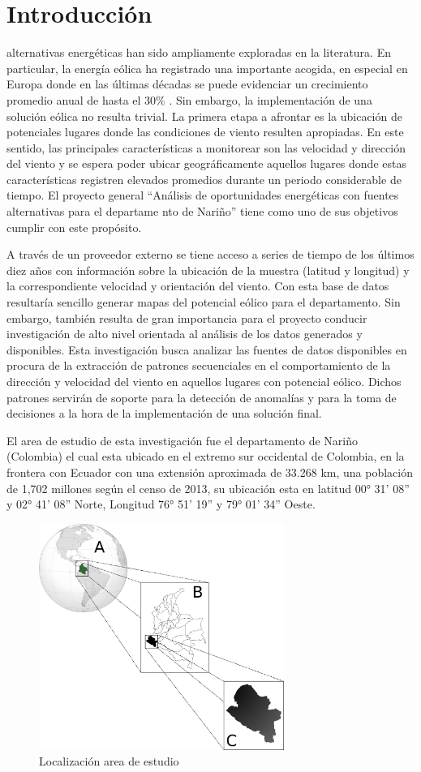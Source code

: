 \section{Introducción}

 alternativas energéticas han sido ampliamente exploradas en la
 literatura.
 En particular, la energía eólica ha registrado una importante acogida,
 en especial en Europa donde en las últimas décadas se puede evidenciar
 un crecimiento promedio anual de hasta el 30\% \cite{ewea2004windindustry}.
 Sin embargo, la implementación de una solución eólica no resulta trivial.
 La primera etapa a afrontar es la ubicación de potenciales lugares donde
 las condiciones de viento resulten apropiadas.
 En este sentido, las principales características a monitorear son las velocidad
 y dirección del viento y se espera poder ubicar geográficamente aquellos
 lugares donde estas características registren elevados promedios durante
 un periodo considerable de tiempo. El proyecto general ``Análisis de oportunidades
 energéticas con fuentes alternativas para el departame
nto de Nariño'' tiene como uno de sus objetivos cumplir con este propósito.

A través de un proveedor externo se tiene acceso a series de tiempo de los
 últimos diez años con información sobre la ubicación de la muestra (latitud
 y longitud) y la correspondiente velocidad y orientación del viento.
 Con esta base de datos resultaría sencillo generar mapas del potencial
 eólico para el departamento.
 Sin embargo, también resulta de gran importancia para el proyecto conducir
 investigación de alto nivel orientada al análisis de los datos generados
 y disponibles.
 Esta investigación busca analizar las fuentes de datos disponibles en procura
 de la extracción de patrones secuenciales en el comportamiento de la dirección
 y velocidad del viento en aquellos lugares con potencial eólico.
 Dichos patrones servirán de soporte para la detección de anomalías y para
 la toma de decisiones a la hora de la implementación de una solución final.
 
 El area de estudio de esta investigación fue el departamento de Nariño (Colombia)
el cual esta ubicado en el extremo sur occidental de Colombia, en la frontera con 
Ecuador con una extensión aproximada de 33.268 km, una población de 1,702 millones según
el censo de 2013, su ubicación 
esta en latitud 00° 31' 08'' y 02° 41' 08'' Norte, Longitud 76° 51' 19'' y 79° 01' 34'' Oeste.

\begin{figure}
  \centering
  \includegraphics[width = 8cm]{locationNarino.png}
  \caption{Localización area de estudio}
  \label{fig:locationNarino}
\end{figure}